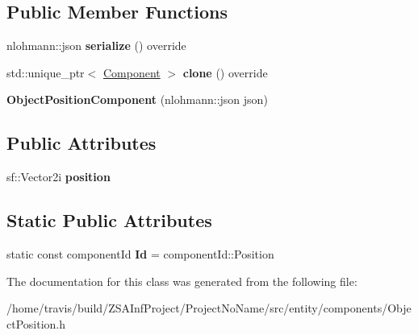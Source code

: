 \subsection*{Public Member Functions}
\begin{DoxyCompactItemize}
\item 
\hypertarget{classObjectPositionComponent_ac4c65aec583cc08b16081c29485e6d28}{nlohmann\-::json {\bfseries serialize} () override}\label{classObjectPositionComponent_ac4c65aec583cc08b16081c29485e6d28}

\item 
\hypertarget{classObjectPositionComponent_aafb494e009274c27ffa1a3f2afc8a773}{std\-::unique\-\_\-ptr$<$ \hyperlink{classComponent}{Component} $>$ {\bfseries clone} () override}\label{classObjectPositionComponent_aafb494e009274c27ffa1a3f2afc8a773}

\item 
\hypertarget{classObjectPositionComponent_a0aaf324a671264e23e3dd5e8978175f3}{{\bfseries Object\-Position\-Component} (nlohmann\-::json json)}\label{classObjectPositionComponent_a0aaf324a671264e23e3dd5e8978175f3}

\end{DoxyCompactItemize}
\subsection*{Public Attributes}
\begin{DoxyCompactItemize}
\item 
\hypertarget{classObjectPositionComponent_a29869d553778510d7ea625c3c6d3234e}{sf\-::\-Vector2i {\bfseries position}}\label{classObjectPositionComponent_a29869d553778510d7ea625c3c6d3234e}

\end{DoxyCompactItemize}
\subsection*{Static Public Attributes}
\begin{DoxyCompactItemize}
\item 
\hypertarget{classObjectPositionComponent_aadcbbd63c9b3b13d6803ad248cdde412}{static const component\-Id {\bfseries Id} = component\-Id\-::\-Position}\label{classObjectPositionComponent_aadcbbd63c9b3b13d6803ad248cdde412}

\end{DoxyCompactItemize}


The documentation for this class was generated from the following file\-:\begin{DoxyCompactItemize}
\item 
/home/travis/build/\-Z\-S\-A\-Inf\-Project/\-Project\-No\-Name/src/entity/components/Object\-Position.\-h\end{DoxyCompactItemize}
